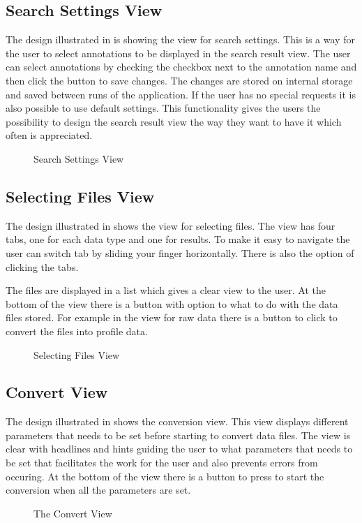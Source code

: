 \subsection{Search Settings View}
The design illustrated in  is showing the view for search settings. This is a way for the user to select annotations to be displayed in the search result view. The user can select annotations by checking the checkbox next to the annotation name and then click the button to save changes. The changes are stored on internal storage and saved between runs of the application. If the user has no special requests it is also possible to use default settings. This functionality gives the users the possibility to design the search result view the way they want to have it which often is appreciated. 

\begin{figure}[ht]
\caption{\label{fig:and_search_settings}Search Settings View}
\end{figure}
\FloatBarrier

\subsection{Selecting Files View}
The design illustrated in  shows the view for selecting files. The view has four tabs, one for each data type and one for results. To make it easy to navigate the user can switch tab by sliding your finger horizontally. There is also the option of clicking the tabs. 

The files are displayed in a list which gives a clear view to the user. At the bottom of the view there is a button with option to what to do with the data files stored. For example in the view for raw data there is a button to click to convert the files into profile data.

\begin{figure}[h]
\caption{\label{fig:and_selected}Selecting Files View}
\end{figure}
\FloatBarrier

\subsection{Convert View}
The design illustrated in  shows the conversion view. This view displays different parameters that needs to be set before starting to convert data files. The view is clear with headlines and hints guiding the user to what parameters that needs to be set that facilitates the work for the user and also prevents errors from occuring. At the bottom of the view there is a button to press to start the conversion when all the parameters are set. 

\begin{figure}[h]
\caption{\label{fig:and_convert_man} The Convert View}
\end{figure}
\FloatBarrier
